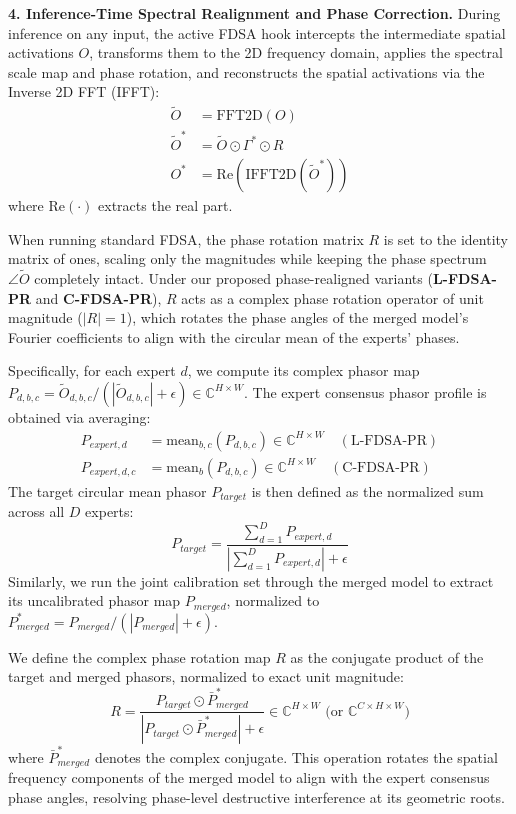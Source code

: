 \documentclass{article}
\begin{document}
\textbf{4. Inference-Time Spectral Realignment and Phase Correction.}
During inference on any input, the active FDSA hook intercepts the intermediate spatial activations $O$, transforms them to the 2D frequency domain, applies the spectral scale map and phase rotation, and reconstructs the spatial activations via the Inverse 2D FFT (IFFT):
\begin{align}
    \tilde{O} &= \text{FFT2D}(O) \\
    \tilde{O}^* &= \tilde{O} \odot \Gamma^* \odot R \\
    O^* &= \text{Re}(\text{IFFT2D}(\tilde{O}^*))
\end{align}
where $\text{Re}(\cdot)$ extracts the real part. 

When running standard FDSA, the phase rotation matrix $R$ is set to the identity matrix of ones, scaling only the magnitudes while keeping the phase spectrum $\angle \tilde{O}$ completely intact. Under our proposed phase-realigned variants (\textbf{L-FDSA-PR} and \textbf{C-FDSA-PR}), $R$ acts as a complex phase rotation operator of unit magnitude ($|R| = 1$), which rotates the phase angles of the merged model's Fourier coefficients to align with the circular mean of the experts' phases.

Specifically, for each expert $d$, we compute its complex phasor map $P_{d, b, c} = \tilde{O}_{d, b, c} / (| \tilde{O}_{d, b, c} | + \epsilon) \in \mathbb{C}^{H \times W}$. The expert consensus phasor profile is obtained via averaging:
\begin{align}
    P_{expert, d} &= \text{mean}_{b,c} (P_{d,b,c}) \in \mathbb{C}^{H \times W} \quad (\text{L-FDSA-PR}) \\
    P_{expert, d, c} &= \text{mean}_{b} (P_{d,b,c}) \in \mathbb{C}^{H \times W} \quad (\text{C-FDSA-PR})
\end{align}
The target circular mean phasor $P_{target}$ is then defined as the normalized sum across all $D$ experts:
\begin{equation}
    P_{target} = \frac{\sum_{d=1}^D P_{expert,d}}{\left| \sum_{d=1}^D P_{expert,d} \right| + \epsilon}
\end{equation}
Similarly, we run the joint calibration set through the merged model to extract its uncalibrated phasor map $P_{merged}$, normalized to $P_{merged}^* = P_{merged} / (|P_{merged}| + \epsilon)$.

We define the complex phase rotation map $R$ as the conjugate product of the target and merged phasors, normalized to exact unit magnitude:
\begin{equation}
    R = \frac{P_{target} \odot \bar{P}_{merged}^*}{| P_{target} \odot \bar{P}_{merged}^* | + \epsilon} \in \mathbb{C}^{H \times W} \text{ (or } \mathbb{C}^{C \times H \times W}\text{)}
\end{equation}
where $\bar{P}_{merged}^*$ denotes the complex conjugate. This operation rotates the spatial frequency components of the merged model to align with the expert consensus phase angles, resolving phase-level destructive interference at its geometric roots.
\end{document}
